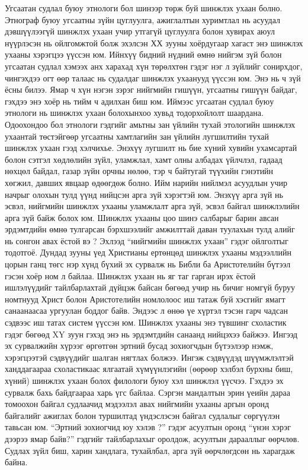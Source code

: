 Угсаатан судлал буюу этнологи бол шинээр төрж буй шинжлэх ухаан болно. Этнограф буюу угсаатны зүйн цуглуулга, ажиглалтын хуримтлал нь асуудал дэвшүүлээгүй шинжлэх ухаан учир утгагүй цуглуулга болон хувирах аюул нүүрлэсэн нь ойлгомжтой болж эхэлсэн ХХ зууны хоёрдугаар хагаст энэ шинжлэх ухааны хэрэгцээ үүссэн юм. Ийнхүү бидний нүдний өмнө нийгэм зүй болон угсаатан судлал хэмээх анх харахад хүн төрөлхтөн гэдэг нэг л зүйлийг сонирхдог, чингэхдээ огт өөр талаас нь судалдаг шинжлэх ухаанууд үүссэн юм. Энэ нь ч зүй ёсны билээ. Ямар ч хүн нэгэн зэрэг нийгмийн гишүүн, угсаатны гишүүн байдаг, гэхдээ энэ хоёр нь тийм ч адилхан биш юм. Иймээс угсаатан судлал буюу этнологи нь шинжлэх ухаан болохынхоо хувьд тодорхойлолт шаардана. Одоохондоо бол этнологи гэдгийг амьтны зан үйлийн тухай этологийн шинжлэх ухаантай төстэйгөөр угсаатны хамтлагийн зан үйлийн лугшилтийн тухай шинжлэх ухаан гээд хэлчихье. Энэхүү лугшилт нь бие хүний хувийн ухамсартай болон сэтгэл хөдлөлийн зүйл, уламжлал, хамт олны албадах үйлчлэл, гадаад нөхцөл байдал, газар зүйн орчны нөлөө, тэр ч байтугай түүхийн гэнэтийн хөгжил, давших явцаар өдөөгдөж болно. Ийм нарийн нийлмэл асуудлын учир начрыг олохын тулд үүнд нийцсэн арга зүй хэрэгтэй юм. Энэхүү арга зүй нь эсвэл, нийгмийн шинжлэх ухааны уламжлалт арга зүй, эсвэл байгал шинжлэлийн арга зүй байж болох юм. Шинжлэх ухааны цоо шинэ салбарыг барин авсан эрдэмтдийн өмнө тулгарсан бэрхшээлийг амжилттай даван туулахын тулд алийг нь сонгон авах ёстой вэ ?
Эхлээд “нийгмийн шинжлэх ухаан” гэдэг ойлголтыг тодотгоё. Дундад зууны үед Христианы ертөнцөд шинжлэх ухааны мэдээллийн цорын ганц төгс нэр хүнд бүхий эх сурвалж нь Библи ба Аристотелийн бүтээл гэсэн хоёр ном л байлаа. Шинжлэх ухаан нь яг таг гарган ирэх ёстой ишлэлүүдийг тайлбарлахтай дүйцэж байсан бөгөөд учир нь бичиг номгүй буруу номтнууд Христ болон Аристотелийн номлолоос иш татаж буй хэсгийг ямагт санаанаасаа ургуулан боддог байв. Эндээс л өнөө үе хүртэл тэсэн гарч чадсан сэдвээс иш татах систем үүссэн юм. Шинжлэх ухааны энэ түвшинг схоластик гэдэг бөгөөд XY зуун гэхэд энэ нь эрдэмтдийн санаанд нийцэхээ байжээ. Ингээд эх сурвалжийн хүрээг өргөтгөн эртний бусад зохиогчдын бүтээлээр нэмж, хэрэгцээтэй сэдвүүдийг шалган нягтлах болжээ. Ингэж сэдвүүдэд шүүмжлэлтэй ханддагаараа схоластикаас ялгаатай хүмүүнлэгийн (өөрөөр хэлбэл бурхны биш, хүний) шинжлэх ухаан болох филологи буюу хэл шинжлэл үүсчээ. Гэхдээ эх сурвалж бахь байдгаараа харь үгс байлаа. Сэргэн мандалтын эрин үеийн дараа томоохон байгал судлаачид мэдээлэл авах нийгмийн ухааны аргын оронд байгалийг ажиглах болон туршилтад үндэслэсэн байгал судлалыг сөргүүлэн тавьсан юм. “Эртний зохиогчид юу хэлэв ?” гэдэг асуултын оронд “үнэн хэрэг дээрээ ямар байв?” гэдгийг тайлбарлахыг оролдож, асуултын дарааллыг өөрчлөв. Судлах зүйл биш, харин хандлага, тухайлбал, арга зүй өөрчлөгдсөн нь харагдаж байна.
